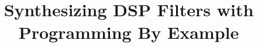 \documentclass{nime-alternate}
\begin{document}
%

\title{Synthesizing DSP Filters with Programming By Example}


%
%
%
%
%
\end{document}
